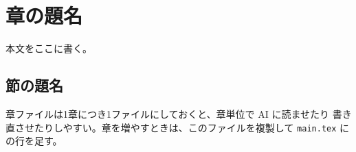 \chapter{章の題名}

本文をここに書く。

\section{節の題名}

章ファイルは1章につき1ファイルにしておくと、章単位で AI に読ませたり
書き直させたりしやすい。章を増やすときは、このファイルを複製して
\verb|main.tex| に \verb|| の行を足す。
